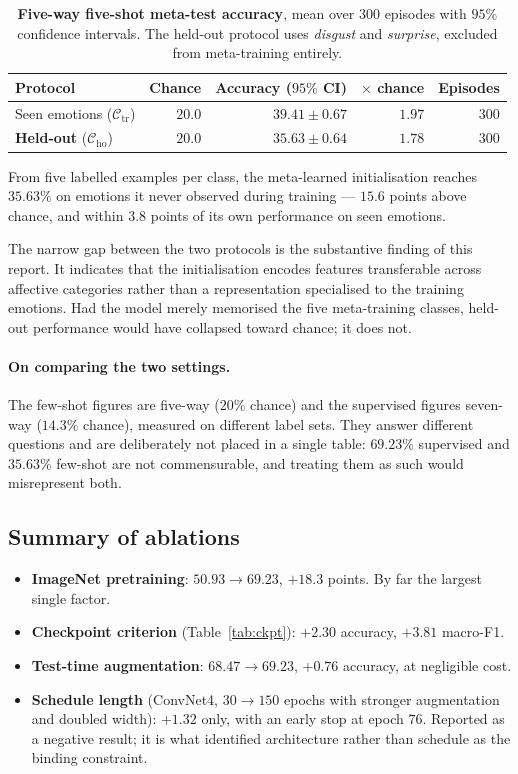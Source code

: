 \documentclass[11pt,a4paper]{article}
\begin{document}
\begin{table}[htbp]
\centering
\small
\begin{tabular}{lrrrr}
\toprule
Protocol & Chance & Accuracy ($95\%$ CI) & $\times$ chance & Episodes \\
\midrule
Seen emotions ($\mathcal{C}_{\text{tr}}$)     & $20.0$ & $39.41 \pm 0.67$ & $1.97$ & $300$ \\
\textbf{Held-out} ($\mathcal{C}_{\text{ho}}$) & $20.0$ & $\mathbf{35.63 \pm 0.64}$ & $1.78$ & $300$ \\
\bottomrule
\end{tabular}
\caption{\textbf{Five-way five-shot meta-test accuracy}, mean over $300$
episodes with $95\%$ confidence intervals. The held-out protocol uses
\emph{disgust} and \emph{surprise}, excluded from meta-training entirely.}
\label{tab:maml}
\end{table}

From five labelled examples per class, the meta-learned initialisation reaches
$35.63\%$ on emotions it never observed during training --- $15.6$ points above
chance, and within $3.8$ points of its own performance on seen emotions.

The narrow gap between the two protocols is the substantive finding of this
report. It indicates that the initialisation encodes features transferable
across affective categories rather than a representation specialised to the
training emotions. Had the model merely memorised the five meta-training
classes, held-out performance would have collapsed toward chance; it does not.

\paragraph{On comparing the two settings.}
The few-shot figures are five-way ($20\%$ chance) and the supervised figures
seven-way ($14.3\%$ chance), measured on different label sets. They answer
different questions and are deliberately not placed in a single table:
$69.23\%$ supervised and $35.63\%$ few-shot are not commensurable, and treating
them as such would misrepresent both.

\subsection{Summary of ablations}
\begin{itemize}\itemsep3pt
\item \textbf{ImageNet pretraining}: $50.93 \to 69.23$, $+18.3$ points. By far
the largest single factor.
\item \textbf{Checkpoint criterion} (Table~\ref{tab:ckpt}): $+2.30$ accuracy,
$+3.81$ macro-F1.
\item \textbf{Test-time augmentation}: $68.47 \to 69.23$, $+0.76$ accuracy, at
negligible cost.
\item \textbf{Schedule length} (ConvNet4, $30 \to 150$ epochs with stronger
augmentation and doubled width): $+1.32$ only, with an early stop at epoch
$76$. Reported as a negative result; it is what identified architecture rather
than schedule as the binding constraint.
\end{itemize}
\end{document}
